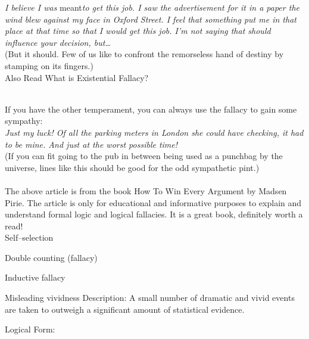 \documentclass[a4paper,12pt,single,pdftex]{scrartcl}
\begin{document}
    
      {\em I believe I was }meant{\em  to get this job. I saw the advertisement for it in a paper the wind blew against my face in Oxford Street. I feel that something put me in that place at that time so that I would get this job. I’m not saying that should influence your decision, but…}
    \\

    
      (But it should. Few of us like to confront the remorseless hand of destiny by stamping on its fingers.)
    \\

    
      

      
        Also Read  What is Existential Fallacy?
      
    
    
       
    \\

    
      If you have the other temperament, you can always use the fallacy to gain some sympathy:
    \\

    
      {\em Just my luck! Of all the parking meters in London she could have checking, it had to be mine. And just at the worst possible time!}
    \\

    
      (If you can fit going to the pub in between being used as a punchbag by the universe, lines like this should be good for the odd sympathetic pint.)
    \\

    
       
    \\

    
      The above article is from the book How To Win Every Argument by Madsen Pirie. The article is only for educational and informative purposes to explain and understand formal logic and logical fallacies. It is a great book, definitely worth a read!
    \\

  

Self–selection

Double counting (fallacy)

Inductive fallacy

Misleading vividness
    Description: A small number of dramatic and vivid events are taken to outweigh a significant amount of statistical evidence.

    
      Logical Form:
    \\
\end{document}
